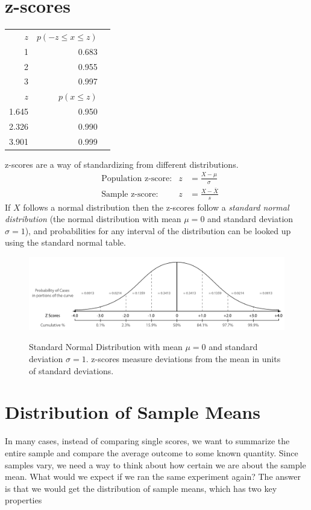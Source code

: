 \documentclass{tufte-handout}
\begin{document}
\section{z-scores}
\begin{margintable}[80pt]
  \centering
  \selectfont
  \begin{tabular}{rrr}
    \toprule
    $z$ & $p(-z \leq x\leq z)$ &\\
     1  &   0.683\\
     2 &   0.955\\
     3 &   0.997\\
    \midrule
    $z$ & $p(x\leq z)$ &\\
     1.645  &   0.950\\
     2.326 &   0.990\\
     3.901 &   0.999\\
    \bottomrule
  \end{tabular}
  \label{tab:normaltab}
\end{margintable}
z-scores are a way of standardizing from different distributions.
\begin{align*}
&\text{Population z-score:} & z&=\frac{X-\mu}{\sigma}\\
&\text{Sample z-score:} & z&=\frac{X-\bar{X}}{s}
\end{align*}
If $X$ follows a normal distribution then the z-scores follow a \emph{standard normal distribution} (the normal distribution with mean $\mu=0$ and standard deviation $\sigma=1$), and probabilities for any interval of the distribution can be looked up using the standard normal table.
\begin{figure}[h]
  \includegraphics[width=\linewidth]{handout2_standard_normal}%
  \label{fig:fullfig}%
  \caption{Standard Normal Distribution with mean $\mu=0$ and standard deviation $\sigma=1$. z-scores measure deviations from the mean in units of standard deviations.}
\end{figure}

\pagebreak

\section{Distribution of Sample Means}
In many cases, instead of comparing single scores, we want to summarize the entire sample and compare the average outcome to some known quantity. Since samples vary, we need a way to think about how certain we are about the sample mean. What would we expect if we ran the same experiment again? The answer is that we would get the distribution of sample means, which has two key properties
\end{document}
